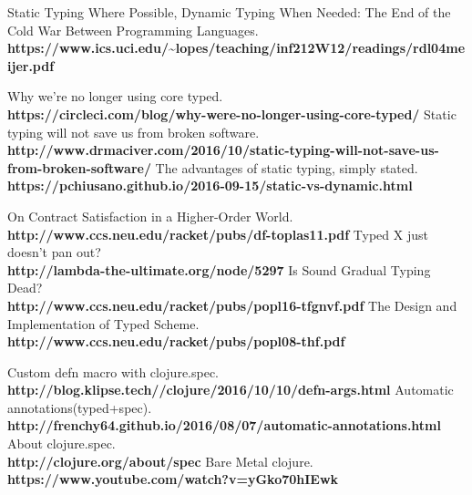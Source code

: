 \documentclass[12pt,a4paper]{report}
\begin{document}


\begin{thebibliography}{9}
  Static Typing Where Possible, Dynamic Typing When Needed: The End of the Cold
  War Between Programming Languages.\\
  \textbf{https://www.ics.uci.edu/\textasciitilde{}lopes/teaching/inf212W12/readings/rdl04meijer.pdf}

  Why we're no longer using core typed.\\
  \textbf{https://circleci.com/blog/why-were-no-longer-using-core-typed/}
  Static typing will not save us from broken software.\\
  \textbf{http://www.drmaciver.com/2016/10/static-typing-will-not-save-us-from-broken-software/}
  The advantages of static typing, simply stated.\\
  \textbf{https://pchiusano.github.io/2016-09-15/static-vs-dynamic.html}



  On Contract Satisfaction in a Higher-Order World.\\
  \textbf{http://www.ccs.neu.edu/racket/pubs/df-toplas11.pdf}
  Typed X just doesn't pan out?\\
  \textbf{http://lambda-the-ultimate.org/node/5297}
  Is Sound Gradual Typing Dead?\\
  \textbf{http://www.ccs.neu.edu/racket/pubs/popl16-tfgnvf.pdf}
  The Design and Implementation of Typed Scheme.\\
  \textbf{http://www.ccs.neu.edu/racket/pubs/popl08-thf.pdf}



  Custom defn macro with clojure.spec.\\
  \textbf{http://blog.klipse.tech//clojure/2016/10/10/defn-args.html}
  Automatic annotations(typed+spec).\\
  \textbf{http://frenchy64.github.io/2016/08/07/automatic-annotations.html}
  About clojure.spec. \\
  \textbf{http://clojure.org/about/spec}
  Bare Metal clojure.\\
  \textbf{https://www.youtube.com/watch?v=yGko70hIEwk}

\end{thebibliography}
\end{document}
